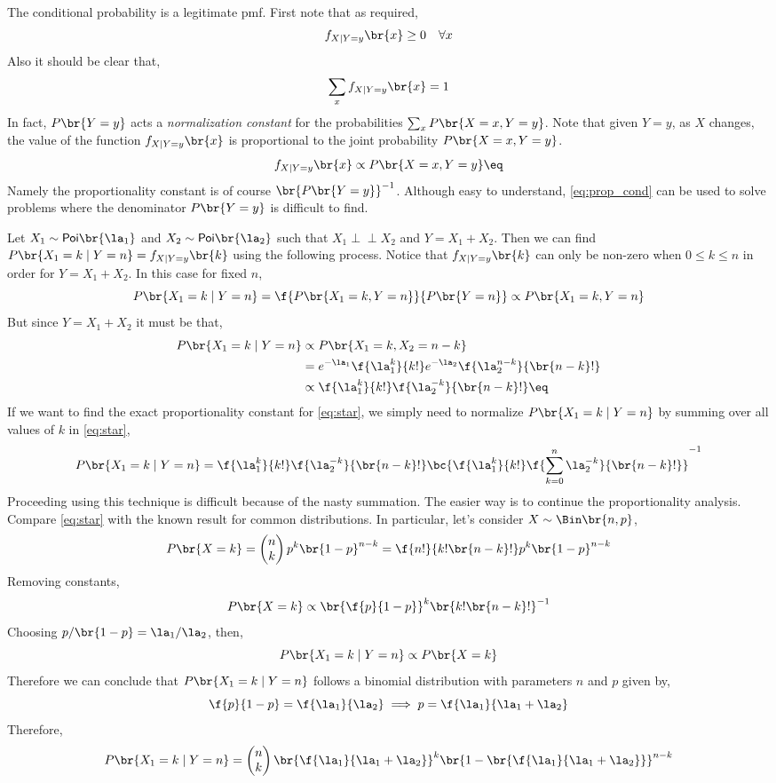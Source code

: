 \documentclass{article}
\newcommand{\indep}{\!\!\perp\!\!\!\!\perp\!\!}
\newcommand{\Poi}{\mathsf{Poi}}
\begin{document}
The conditional probability is a legitimate pmf. First note that as required,
\[ f_{X \mid Y=y}\br{x} \geq 0 \quad \forall x \]
Also it should be clear that,
\[ \sum_{x}f_{X \mid Y=y}\br{x} = 1 \]
In fact, $P\br{Y=y}$ acts a \textit{normalization constant} for the probabilities $\sum_{x} P\br{X=x, Y=y}$. Note that given $Y=y$, as $X$ changes, the value of the function $f_{X \mid Y=y}\br{x}$ is proportional to the joint probability $P\br{X=x, Y=y}$.
\[ f_{X \mid Y=y}\br{x} \propto P\br{X=x, Y=y} \eq \label{eq:prop_cond}\]
Namely the proportionality constant is of course $\br{P\br{Y=y}}^{-1}$. Although easy to understand, \cref{eq:prop_cond} can be used to solve problems where the denominator $P\br{Y=y}$ is difficult to find.

\begin{example}
    Let $X_1 \sim \Poi \br{\la_1}$ and $X_2 \sim \Poi \br{\la_2}$ such that $X_1 \indep X_2$ and $Y = X_1 + X_2$. Then we can find $P\br{X_1 = k \mid Y = n} = f_{X \mid Y = y}\br{k}$ using the following process. Notice that $f_{X \mid Y = y}\br{k}$ can only be non-zero when $0 \leq k \leq n$ in order for $Y = X_1 + X_2$. In this case for fixed $n$,
    \[ P\br{X_1 = k \mid Y = n} = \f{P\br{X_1 = k, Y = n}}{P\br{Y = n}} \propto P\br{X_1 = k, Y = n} \]
    But since $Y = X_1 + X_2$ it must be that,
    \begin{align*}
    P\br{X_1 = k \mid Y = n} &\propto P\br{X_1 = k, X_2 = n - k} \\
    &= e^{-\la_1} \f{\la_1^k}{k!}e^{-\la_2} \f{\la_2^{n-k}}{\br{n-k}!} \\
    &\propto \f{\la_1^k}{k!}\f{\la_2^{-k}}{\br{n-k}!} \eq \label{eq:star}
    \end{align*}
    If we want to find the exact proportionality constant for \cref{eq:star}, we simply need to normalize $P\br{X_1 = k \mid Y = n}$ by summing over all values of $k$ in \cref{eq:star},
    \[ P\br{X_1 = k \mid Y=n} = \f{\la_1^k}{k!}\f{\la_2^{-k}}{\br{n-k}!}\bc{\f{\la_1^k}{k!}\f{\sum_{k=0}^{n}\la_2^{-k}}{\br{n-k}!}}^{-1} \]
    Proceeding using this technique is difficult because of the nasty summation. The easier way is to continue the proportionality analysis. Compare \cref{eq:star} with the known result for common distributions. In particular, let's consider $X \sim \Bin\br{n, p}$,
    \[ P\br{X=k} = \begin{pmatrix}n\\k\end{pmatrix} p^k \br{1-p}^{n-k} = \f{n!}{k!\br{n-k}!} p^k \br{1-p}^{n-k} \]
    Removing constants,
    \[ P\br{X=k} \propto \br{\f{p}{1-p}}^k \br{k! \br{n-k}!}^{-1} \]
    Choosing $p/\br{1-p} = \la_1/\la_2$, then,
    \[ P\br{X_1 = k \mid Y = n} \propto P\br{X=k} \]
    Therefore we can conclude that $P\br{X_1 = k \mid Y = n}$ follows a binomial distribution with parameters $n$ and $p$ given by,
    \[ \f{p}{1-p} = \f{\la_1}{\la_2} \implies p = \f{\la_1}{\la_1 + \la_2}\]
    Therefore,
    \[ P\br{X_1 = k \mid Y = n} = \begin{pmatrix}n\\k\end{pmatrix} \br{\f{\la_1}{\la_1 + \la_2}}^k \br{1-\br{\f{\la_1}{\la_1 + \la_2}}}^{n-k} \]
\end{example}
\end{document}
